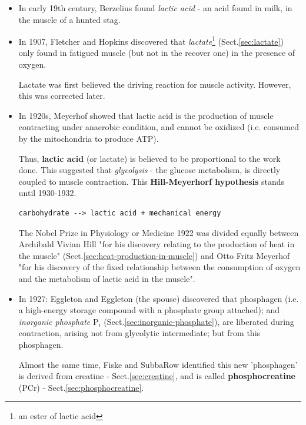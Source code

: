 \begin{itemize}
\item In early 19th century, Berzelius found {\it lactic acid} - an
  acid found in milk, in the muscle of a hunted stag.

\item In 1907, Fletcher and Hopkins discovered that
  {\it lactate}\footnote{an ester of lactic acid} (Sect.\ref{sec:lactate}) only
  found in fatigued muscle (but not in the recover one) in the presence of
  oxygen.

Lactate was first believed the driving reaction for muscle activity.
However, this was corrected later.

\item In 1920s, Meyerhof showed that lactic acid is the production of
  muscle contracting under anaerobic condition, and cannot be
  oxidized (i.e. consumed by the mitochondria to produce ATP). 

Thus, {\bf lactic acid} (or lactate) is believed to be proportional to the work
done. This suggested that {\it glycolysis} - the glucose metabolism, is directly
coupled to muscle contraction. This {\bf Hill-Meyerhorf hypothesis} stands until
1930-1932.

\label{sec:Hill-Meyerhorf-hypothesis}
\begin{verbatim}
carbohydrate --> lactic acid + mechanical energy
\end{verbatim}

The Nobel Prize in Physiology or Medicine 1922 was divided equally between
Archibald Vivian Hill "for his discovery relating to the production of heat in
the muscle" (Sect.\ref{sec:heat-production-in-muscle}) and Otto Fritz Meyerhof
"for his discovery of the fixed relationship between the consumption of oxygen
and the metabolism of lactic acid in the muscle".

\item In 1927: Eggleton and Eggleton (the spouse) discovered that phosphagen
(i.e. a high-energy storage compound with a phosphate group attached); and {\it
inorganic phosphate} P$_i$ (Sect.\ref{sec:inorganic-phosphate}), are liberated
during contraction, arising not from glycolytic intermediate; but from this
phosphagen. 

Almost the same time, Fiske and SubbaRow identified this new 'phosphagen' is
derived from creatine - Sect.\ref{sec:creatine}, and is called {\bf
phosphocreatine} (PCr) - Sect.\ref{sec:phosphocreatine}.



\end{itemize}

